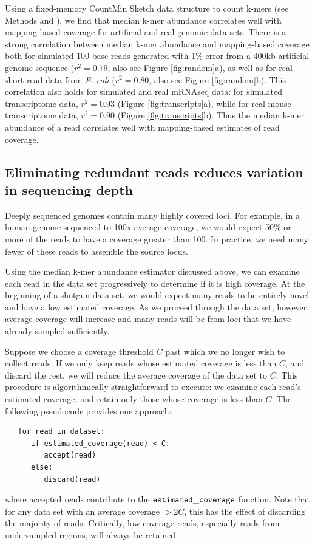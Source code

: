Using a fixed-memory CountMin Sketch data structure to count k-mers
(see Methods and \cite{countminsketch}), we find that median k-mer
abundance correlates well with mapping-based coverage for artificial
and real genomic data sets.  There is a strong correlation between
median k-mer abundance and mapping-based coverage both for simulated
100-base reads generated with 1\% error from a 400kb artificial genome
sequence ($r^2 = 0.79$; also see Figure \ref{fig:random}a), as well as
for real short-read data from {\em E. coli} ($r^2 = 0.80$, also see
Figure \ref{fig:random}b).  This correlation also holds for simulated
and real mRNAseq data: for simulated transcriptome data, $r^2 = 0.93$
(Figure \ref{fig:transcripts}a), while for real mouse transcriptome
data, $r^2 = 0.90$ (Figure \ref{fig:transcripts}b).
Thus the median k-mer abundance of a read correlates
well with mapping-based estimates of read coverage.


\subsection{Eliminating redundant reads reduces variation in sequencing depth}

Deeply sequenced genomes contain many highly covered loci.  For
example, in a human genome sequenced to 100x average coverage, we would
expect 50\% or more of the reads to have a coverage greater than 100.
In practice, we need many fewer of these reads to assemble
the source locus.

Using the median k-mer abundance estimator discussed above, we can examine each read
in the data set progressively to determine if it is high coverage.  At
the beginning of a shotgun data set, we would expect many reads to be
entirely novel and have a low estimated coverage.  As we proceed
through the data set, however, average coverage will increase and many
reads will be from loci that we have already sampled sufficiently.

Suppose we choose a coverage threshold $C$ past which we no longer
wish to collect reads. If we only keep reads whose estimated coverage
is less than $C$, and discard the rest, we will reduce the average
coverage of the data set to $C$.  This procedure is
algorithmically straightforward to execute: we examine each read's
estimated coverage, and retain only those whose coverage is less than $C$.
The following pseudocode provides one approach:
\begin{verbatim}
   for read in dataset:
      if estimated_coverage(read) < C:
         accept(read)
      else:
         discard(read)
\end{verbatim}
\noindent
where accepted reads contribute to the $\tt estimated\_coverage$
function.  Note that for any data set with an average coverage $> 2C$,
this has the effect of discarding the majority of reads.  Critically,
low-coverage reads, especially reads from undersampled regions, will
always be retained.


